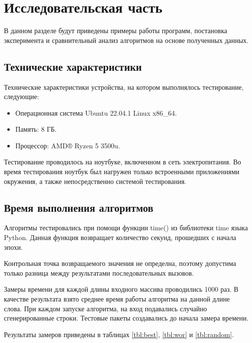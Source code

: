 \chapter{Исследовательская часть}

В данном разделе будут приведены примеры работы программ, постановка эксперимента и сравнительный анализ алгоритмов на основе полученных данных.

\section{Технические характеристики}

Технические характеристики устройства, на котором выполнялось тестирование, следующие:

\begin{itemize}
	\item Операционная система Ubuntu 22.04.1 \cite{ubuntu} Linux x86\_64.
	\item Память: 8 ГБ.
	\item Процессор: AMD® Ryzen 5 3500u.
\end{itemize}

Тестирование проводилось на ноутбуке, включенном в сеть электропитания. Во время тестирования ноутбук был нагружен только встроенными приложениями окружения, а также непосредственно системой тестирования.

\section{Время выполнения алгоритмов}

Алгоритмы тестировались при помощи функции time() из библиотеки time языка Python. Данная функция возвращает количество секунд, прошедших с начала эпохи.

Контрольная точка возвращаемого значения не определна, поэтому допустима только разница между результатами последовательных вызовов.

Замеры времени для каждой длины входного массива проводились 1000 раз. В качестве результата взято среднее время работы алгоритма на данной длине слова. При каждом запуске алгоритма, на вход подавались случайно сгенерированные строки. Тестовые пакеты создавались до начала замера времени.

Результаты замеров приведены в таблицах \ref{tbl:best}, \ref{tbl:wor} и \ref{tbl:random}.

